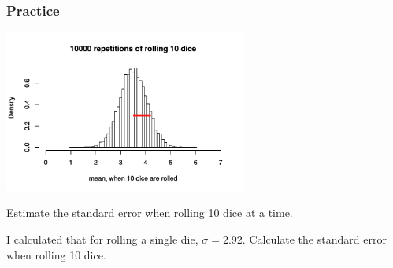 \begin{frame}
\frametitle{Practice}
\vspace{-20pt}
\begin{center}
\includegraphics[width=0.6\textwidth]{4-1_var_in_est/figures/six_sided_dice/rolls_by_10_SE.pdf}
\end{center}
\vspace{-20pt}Estimate the standard error when rolling 10 dice at a time.

\pause {}
\vfill
\pause
I calculated that for rolling a single die, $\sigma = 2.92$. Calculate the standard error when rolling 10 dice.
\vfill
\end{frame}
